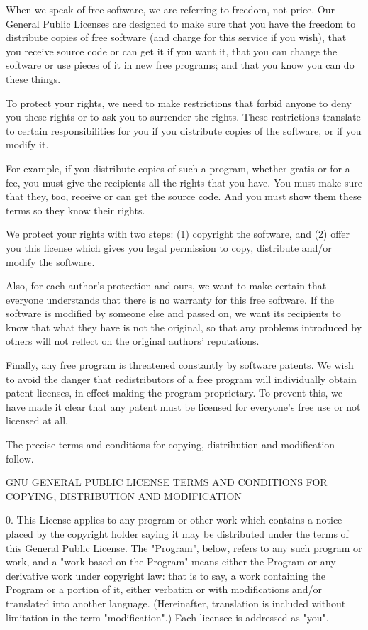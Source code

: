 \documentclass[11pt,a4paper]{article}
\begin{document}
\begin{itemize}
		When we speak of free software, we are referring to freedom, not
		price.  Our General Public Licenses are designed to make sure that you
		have the freedom to distribute copies of free software (and charge for
		this service if you wish), that you receive source code or can get it
		if you want it, that you can change the software or use pieces of it
		in new free programs; and that you know you can do these things.

		To protect your rights, we need to make restrictions that forbid
		anyone to deny you these rights or to ask you to surrender the rights.
		These restrictions translate to certain responsibilities for you if you
		distribute copies of the software, or if you modify it.

		For example, if you distribute copies of such a program, whether
		gratis or for a fee, you must give the recipients all the rights that
		you have.  You must make sure that they, too, receive or can get the
		source code.  And you must show them these terms so they know their
		rights.

		We protect your rights with two steps: (1) copyright the software, and
		(2) offer you this license which gives you legal permission to copy,
		distribute and/or modify the software.

		Also, for each author's protection and ours, we want to make certain
		that everyone understands that there is no warranty for this free
		software.  If the software is modified by someone else and passed on, we
		want its recipients to know that what they have is not the original, so
		that any problems introduced by others will not reflect on the original
		authors' reputations.

		Finally, any free program is threatened constantly by software
		patents.  We wish to avoid the danger that redistributors of a free
		program will individually obtain patent licenses, in effect making the
		program proprietary.  To prevent this, we have made it clear that any
		patent must be licensed for everyone's free use or not licensed at all.

		The precise terms and conditions for copying, distribution and
		modification follow.

		GNU GENERAL PUBLIC LICENSE
		TERMS AND CONDITIONS FOR COPYING, DISTRIBUTION AND MODIFICATION

		0. This License applies to any program or other work which contains
		a notice placed by the copyright holder saying it may be distributed
		under the terms of this General Public License.  The "Program", below,
		refers to any such program or work, and a "work based on the Program"
		means either the Program or any derivative work under copyright law:
		that is to say, a work containing the Program or a portion of it,
		either verbatim or with modifications and/or translated into another
		language.  (Hereinafter, translation is included without limitation in
		the term "modification".)  Each licensee is addressed as "you".


\end{itemize}
\end{document}
